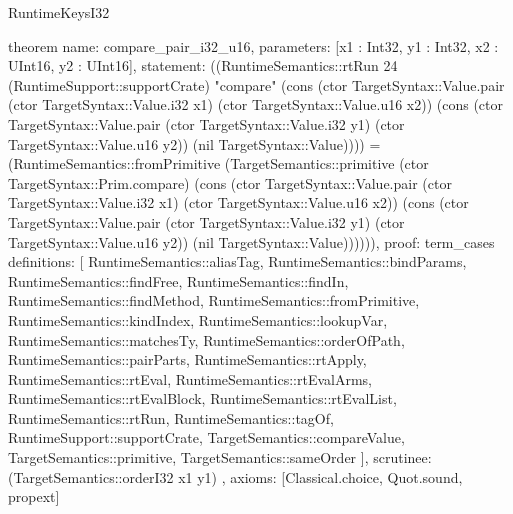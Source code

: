 \begin{lexlean}{RuntimeKeysI32}
\begin{semanticmodule}
theorem{
  name: compare_pair_i32_u16,
  parameters: [x1 : Int32, y1 : Int32, x2 : UInt16, y2 : UInt16],
  statement: ((RuntimeSemantics::rtRun 24 (RuntimeSupport::supportCrate) "compare" (cons (ctor TargetSyntax::Value.pair (ctor TargetSyntax::Value.i32 x1) (ctor TargetSyntax::Value.u16 x2)) (cons (ctor TargetSyntax::Value.pair (ctor TargetSyntax::Value.i32 y1) (ctor TargetSyntax::Value.u16 y2)) (nil TargetSyntax::Value)))) = (RuntimeSemantics::fromPrimitive (TargetSemantics::primitive (ctor TargetSyntax::Prim.compare) (cons (ctor TargetSyntax::Value.pair (ctor TargetSyntax::Value.i32 x1) (ctor TargetSyntax::Value.u16 x2)) (cons (ctor TargetSyntax::Value.pair (ctor TargetSyntax::Value.i32 y1) (ctor TargetSyntax::Value.u16 y2)) (nil TargetSyntax::Value)))))),
  proof: term_cases{
    definitions: [
      RuntimeSemantics::aliasTag,
      RuntimeSemantics::bindParams,
      RuntimeSemantics::findFree,
      RuntimeSemantics::findIn,
      RuntimeSemantics::findMethod,
      RuntimeSemantics::fromPrimitive,
      RuntimeSemantics::kindIndex,
      RuntimeSemantics::lookupVar,
      RuntimeSemantics::matchesTy,
      RuntimeSemantics::orderOfPath,
      RuntimeSemantics::pairParts,
      RuntimeSemantics::rtApply,
      RuntimeSemantics::rtEval,
      RuntimeSemantics::rtEvalArms,
      RuntimeSemantics::rtEvalBlock,
      RuntimeSemantics::rtEvalList,
      RuntimeSemantics::rtRun,
      RuntimeSemantics::tagOf,
      RuntimeSupport::supportCrate,
      TargetSemantics::compareValue,
      TargetSemantics::primitive,
      TargetSemantics::sameOrder
    ],
    scrutinee: (TargetSemantics::orderI32 x1 y1)
  },
  axioms: [Classical.choice, Quot.sound, propext]
}


\end{semanticmodule}
\end{lexlean}
